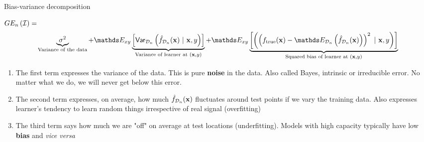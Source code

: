 \documentclass[11pt,compress,t,notes=noshow, xcolor=table]{beamer}
\begin{document}
\begin{vbframe} {Bias-variance decomposition}
\begin{footnotesize}
$GE_n\left(\mathcal{I}\right) =$  
$$
 \underbrace{\sigma^2}_{\text{Variance of the data}} + \E_{xy}\underbrace{\left[\var_{\D_n}\left(\fh_{\D_n}(\xv) ~|~\xv, y\right)\right]}_{\text{Variance of learner at } (\xv, y)} + \E_{xy}\underbrace{\left[\left(\left(\ftrue(\xv)-\E_{\D_n}\left(\fh_{\D_n}(\xv)\right)\right)^2~|~\xv, y\right)\right]}_{\text{Squared bias of learner at } (\xv, y)}  
$$
\end{footnotesize}
\begin{enumerate}
  \item The first term expresses the variance of the data. 
    This is pure \textbf{noise} in the data.
    Also called Bayes, intrinsic or irreducible error.
    No matter what we do, we will never get below this error.
  \item The second term expresses, on average, how much $\hat{f}_{\mathcal{D}_n}(\mathbf{x})$ fluctuates around test points if we vary the training data. Also expresses learner's tendency to learn random things irrespective of real signal (overfitting)
  \item The third term says how much we are "off" on average at test locations (underfitting).
    Models with high capacity typically have low \textbf{bias} and \textit{vice versa}
\end{enumerate}











\end{vbframe}
\end{document}

